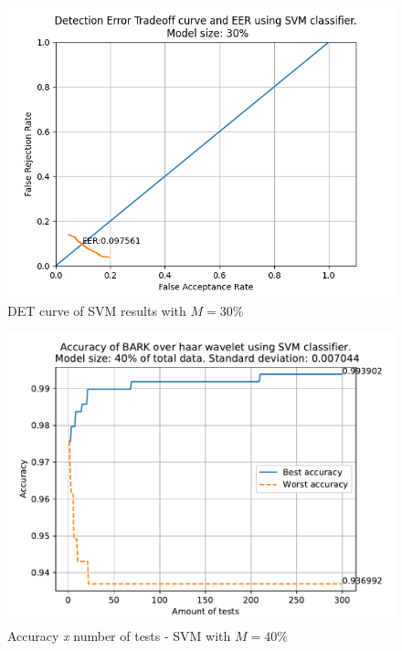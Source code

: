 	\begin{figure}[H]
		\centering
		\includegraphics[scale=.8]{images/results/det/DET_SVM_30}
		\caption{DET curve of SVM results with $M=30\%$}
		\label{fig:detsvm30}
	\end{figure}
	\begin{figure}[H]
		\centering
		\includegraphics[scale=.8]{images/results/confusionMatrices/classifier_SVM_40.pdf}
		\caption{Accuracy \textit{x} number of tests - SVM with $M=40\%$}
		\label{fig:classifiersvm40}
	\end{figure}
